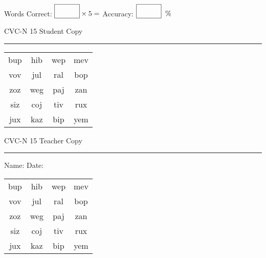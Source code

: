 \documentclass{memoir}
\begin{document}
\small

Words Correct: $\fbox{\phantom{\huge 100}} \times 5 = $ Accuracy: $\fbox{\phantom{\huge 100}}\;\; \%$ 

\vfill

\newpage


\footnotesize \noindent
CVC-N 15 \hfill Student Copy
\smallskip
\hrule

\Large

\setlength{\tabcolsep}{14pt}
\def\arraystretch{2}

{\selectfont


\begin{vplace}[0.5]
\begin{center}
\begin{tabular}{cccc}
bup & hib & wep & mev \\
vov & jul & ral & bop \\
zoz & weg & paj & zan \\
siz & coj & tiv & rux \\
jux & kaz & bip & yem \\
\end{tabular}
\end{center}
\end{vplace}

}

\newpage

\footnotesize \noindent
CVC-N 15 \hfill Teacher Copy
\smallskip
\hrule

\small

\vfill

\noindent
Name: \underline{\hspace{1.75in}} \hfill Date: \underline{\hspace{1in}}

\Large

{\selectfont


\begin{vplace}[0.5]
\begin{center}
\begin{tabular}{cccc}
bup & hib & wep & mev \\
vov & jul & ral & bop \\
zoz & weg & paj & zan \\
siz & coj & tiv & rux \\
jux & kaz & bip & yem \\
\end{tabular}
\end{center}
\end{vplace}



}
\end{document}
